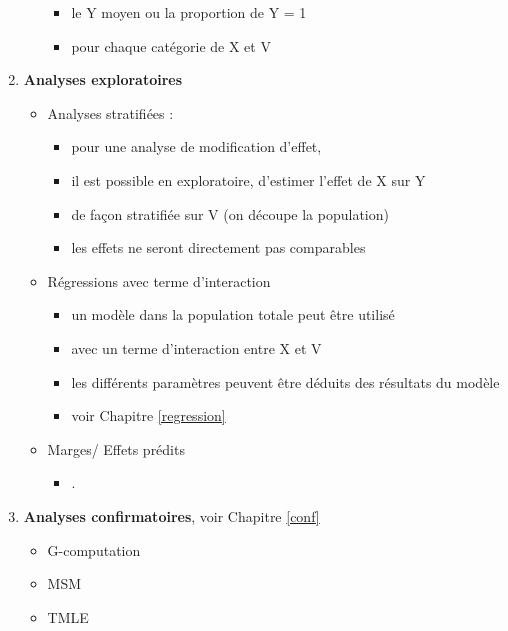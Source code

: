 \documentclass[
]{book}
\providecommand{\tightlist}{%
  \setlength{\itemsep}{0pt}\setlength{\parskip}{0pt}}
\begin{document}
\begin{enumerate}
\begin{itemize}
    \begin{itemize}
    \tightlist
    \item
      le Y moyen ou la proportion de Y = 1
    \item
      pour chaque catégorie de X et V
    \end{itemize}
  \end{itemize}
\item
  \textbf{Analyses exploratoires}

  \begin{itemize}
  \tightlist
  \item
    Analyses stratifiées :

    \begin{itemize}
    \tightlist
    \item
      pour une analyse de modification d'effet,
    \item
      il est possible en exploratoire, d'estimer l'effet de X sur Y
    \item
      de façon stratifiée sur V (on découpe la population)
    \item
      les effets ne seront directement pas comparables
    \end{itemize}
  \item
    Régressions avec terme d'interaction

    \begin{itemize}
    \tightlist
    \item
      un modèle dans la population totale peut être utilisé
    \item
      avec un terme d'interaction entre X et V
    \item
      les différents paramètres peuvent être déduits des résultats du modèle
    \item
      voir Chapitre \ref{regression}
    \end{itemize}
  \item
    Marges/ Effets prédits

    \begin{itemize}
    \tightlist
    \item
      .
    \end{itemize}
  \end{itemize}
\item
  \textbf{Analyses confirmatoires}, voir Chapitre \ref{conf}

  \begin{itemize}
  \tightlist
  \item
    G-computation
  \item
    MSM
  \item
    TMLE
  \end{itemize}
\end{enumerate}
\end{document}
